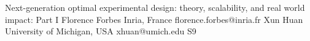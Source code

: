 \documentclass[12pt,lettersize,oneside]{book} %
\begin{document}
\clearpage

\begin{session}
 {Next-generation optimal experimental design: theory, scalability, and real world impact: Part I}%
 {Florence Forbes}%
 {Inria, France}%
 {florence.forbes@inria.fr}%
 {Xun Huan}%
 {University of Michigan, USA}%
 {xhuan@umich.edu}%
 {S9}%
 {}%


\end{session}
\end{document}
